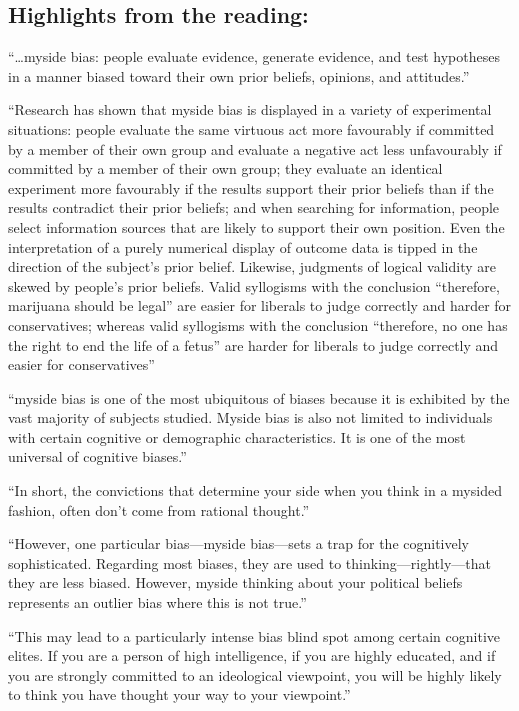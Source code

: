 \documentclass[
]{book}
\begin{document}
\hypertarget{highlights-from-the-reading-2}{%
\subsection{Highlights from the reading:}\label{highlights-from-the-reading-2}}

``\ldots myside bias: people evaluate evidence, generate evidence, and test hypotheses in a manner biased toward their own prior beliefs, opinions, and attitudes.''

``Research has shown that myside bias is displayed in a variety of experimental situations: people evaluate the same virtuous act more favourably if committed by a member of their own group and evaluate a negative act less unfavourably if committed by a member of their own group; they evaluate an identical experiment more favourably if the results support their prior beliefs than if the results contradict their prior beliefs; and when searching for information, people select information sources that are likely to support their own position. Even the interpretation of a purely numerical display of outcome data is tipped in the direction of the subject's prior belief. Likewise, judgments of logical validity are skewed by people's prior beliefs. Valid syllogisms with the conclusion ``therefore, marijuana should be legal'' are easier for liberals to judge correctly and harder for conservatives; whereas valid syllogisms with the conclusion ``therefore, no one has the right to end the life of a fetus'' are harder for liberals to judge correctly and easier for conservatives''

``myside bias is one of the most ubiquitous of biases because it is exhibited by the vast majority of subjects studied. Myside bias is also not limited to individuals with certain cognitive or demographic characteristics. It is one of the most universal of cognitive biases.''

``In short, the convictions that determine your side when you think in a mysided fashion, often don't come from rational thought.''

``However, one particular bias---myside bias---sets a trap for the cognitively sophisticated. Regarding most biases, they are used to thinking---rightly---that they are less biased. However, myside thinking about your political beliefs represents an outlier bias where this is not true.''

``This may lead to a particularly intense bias blind spot among certain cognitive elites. If you are a person of high intelligence, if you are highly educated, and if you are strongly committed to an ideological viewpoint, you will be highly likely to think you have thought your way to your viewpoint.''
\end{document}
